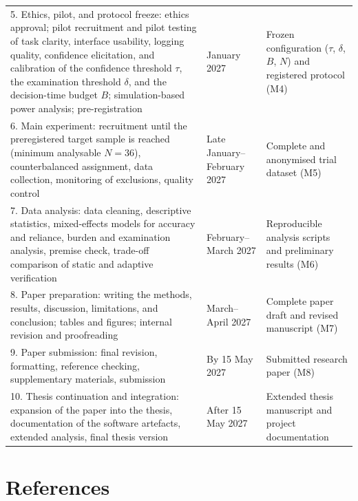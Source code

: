 \documentclass[oneside,final,14pt,a4paper]{extreport}
\begin{document}
\begin{longtable}{p{8.0cm}p{2.4cm}p{5.3cm}}
5. Ethics, pilot, and protocol freeze:
ethics approval; pilot recruitment and pilot testing of task clarity,
interface usability, logging quality, confidence elicitation, and calibration
of the confidence threshold $\tau$, the examination threshold $\delta$, and
the decision-time budget $B$; simulation-based power analysis;
pre-registration &
January 2027 &
Frozen configuration ($\tau$, $\delta$, $B$, $N$) and registered protocol (M4) \\


6. Main experiment:
recruitment until the preregistered target sample is reached (minimum
analysable $N=36$), counterbalanced assignment, data collection, monitoring
of exclusions, quality control &
Late January--February 2027 &
Complete and anonymised trial dataset (M5) \\


7. Data analysis:
data cleaning, descriptive statistics, mixed-effects models for accuracy and
reliance, burden and examination analysis, premise check, trade-off
comparison of static and adaptive verification &
February--March 2027 &
Reproducible analysis scripts and preliminary results (M6) \\


8. Paper preparation:
writing the methods, results, discussion, limitations, and conclusion;
tables and figures; internal revision and proofreading &
March--April 2027 &
Complete paper draft and revised manuscript (M7) \\


9. Paper submission:
final revision, formatting, reference checking, supplementary materials,
submission &
By 15 May 2027 &
Submitted research paper (M8) \\


10. Thesis continuation and integration:
expansion of the paper into the thesis, documentation of the software
artefacts, extended analysis, final thesis version &
After 15 May 2027 &
Extended thesis manuscript and project documentation \\


\end{longtable}

\section{References}
\printbibliography[heading=none]
\end{document}
